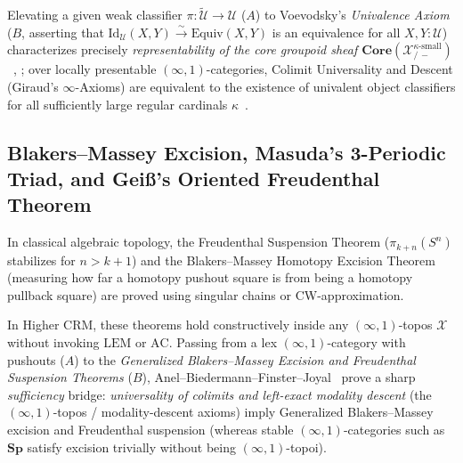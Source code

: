 Elevating a given weak classifier $\pi : \widetilde{\mathcal{U}} \to \mathcal{U}$ ($A$) to Voevodsky's \emph{Univalence Axiom}~\cite[\S 2.10]{HoTT13} ($B$, asserting that $\mathrm{Id}_{\mathcal{U}}(X, Y) \xrightarrow{\sim} \mathrm{Equiv}(X, Y)$ is an equivalence for all $X, Y: \mathcal{U}$) characterizes precisely \emph{representability of the core groupoid sheaf $\mathbf{Core}(\mathcal{X}_{/\,-}^{\kappa\text{-small}})$}~\cite[\S 6.1.6]{Lurie09}, \cite{GepnerKock17}; over locally presentable $(\infty, 1)$-categories, Colimit Universality and Descent (Giraud's $\infty$-Axioms) are equivalent to the existence of univalent object classifiers for all sufficiently large regular cardinals $\kappa$~\cite[\S\S 6.1.3, 6.1.6, Thm.~6.1.6.8]{Lurie09}.

\subsection{Blakers--Massey Excision, Masuda's 3-Periodic Triad, and Gei\ss's Oriented Freudenthal Theorem}

In classical algebraic topology, the Freudenthal Suspension Theorem ($\pi_{k+n}(S^n)$ stabilizes for $n > k+1$) and the Blakers--Massey Homotopy Excision Theorem (measuring how far a homotopy pushout square is from being a homotopy pullback square) are proved using singular chains or CW-approximation.

In Higher $\mathrm{CRM}$, these theorems hold constructively inside any $(\infty, 1)$-topos $\mathcal{X}$ without invoking $\mathrm{LEM}$ or $\mathrm{AC}$. Passing from a lex $(\infty, 1)$-category with pushouts ($A$) to the \emph{Generalized Blakers--Massey Excision and Freudenthal Suspension Theorems} ($B$), Anel--Biedermann--Finster--Joyal~\cite[\S\S 3--4, Thm.~4.1.1]{ABFJ20} prove a sharp \emph{sufficiency} bridge: \emph{universality of colimits and left-exact modality descent} (the $(\infty, 1)$-topos / modality-descent axioms) imply Generalized Blakers--Massey excision and Freudenthal suspension (whereas stable $(\infty, 1)$-categories such as $\mathbf{Sp}$ satisfy excision trivially without being $(\infty, 1)$-topoi).

